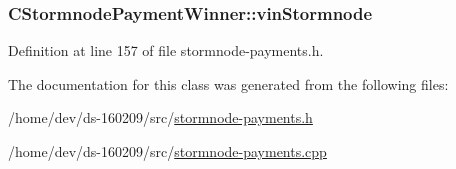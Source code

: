 \subsubsection[{vin\+Stormnode}]{ C\+Stormnode\+Payment\+Winner\+::vin\+Stormnode}\label{class_c_stormnode_payment_winner_a6514e77cb8997131c47e39b3118606fa}


Definition at line 157 of file stormnode-\/payments.\+h.



The documentation for this class was generated from the following files\+:\begin{DoxyCompactItemize}
\item 
/home/dev/ds-\/160209/src/\hyperlink{stormnode-payments_8h}{stormnode-\/payments.\+h}\item 
/home/dev/ds-\/160209/src/\hyperlink{stormnode-payments_8cpp}{stormnode-\/payments.\+cpp}\end{DoxyCompactItemize}
